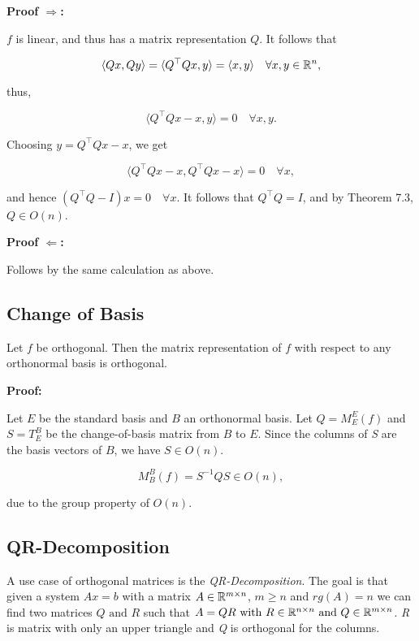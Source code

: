 \textbf{Proof \(\Rightarrow\):} 

\(f\) is linear, and thus has a matrix representation \( Q \). It follows that

\[
    \langle Qx, Qy \rangle = \langle Q^\top Qx, y \rangle = \langle x, y \rangle \quad \forall x, y 
    \in \mathbb{R}^n,
\]

thus,

\[
    \langle Q^\top Qx - x, y \rangle = 0 \quad \forall x, y.
\]

Choosing \( y = Q^\top Qx - x \), we get

\[
    \langle Q^\top Qx - x, Q^\top Qx - x \rangle = 0 \quad \forall x,
\]

and hence \( (Q^\top Q - I)x = 0 \quad \forall x \).  
It follows that \( Q^\top Q = I \), and by Theorem 7.3, \( Q \in O(n) \).

\QED

\textbf{Proof \(\Leftarrow\):} 

Follows by the same calculation as above.

\QED

\subsection{Change of Basis}

Let \(f\) be orthogonal. Then the matrix representation of \(f\)  
with respect to any orthonormal basis is orthogonal.

\textbf{Proof:} 

Let \( E \) be the standard basis and \(B\) an orthonormal basis. Let  
\( Q = M_E^E(f) \) and \( S = T_E^B \) be the change-of-basis matrix from \(B\) to \( E \).  
Since the columns of \emph{S} are the basis vectors of \(B\), we have \( S \in O(n) \).  

\[
    M_B^B(f) = S^{-1} Q S \in O(n),
\]

due to the group property of \( O(n) \).

\QED

\subsection{QR-Decomposition}

A use case of orthogonal matrices is the \emph{QR-Decomposition}. The goal is that given a system 
\( Ax = b\) with a matrix \(A\in \mathbb{R}^{m \times n}\), \(m \ge n\) and \(rg(A) = n\) we can find 
two matrices \(Q \text{ and } R\) such that \(A = QR \text{ with } R\in \mathbb{R}^{n \times n} 
\text{ and } Q \in \mathbb{R}^{m \times n}\). \emph{R} is matrix with only an upper triangle and 
\emph{Q} is orthogonal for the columns.


